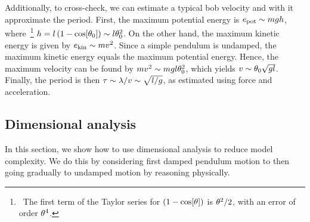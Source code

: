 Additionally, to cross-check, we can estimate a typical bob velocity and with it approximate the period. First, the maximum potential energy is $e_\text{pot}\sim mgh$, where~\footnote{~The first term of the Taylor series for $\left(1 - \cos\!\left[{\theta}\right]\right)$ is $\theta^2/2$, with an error of order $\theta^4$.} $h = l\left(1 - \cos\!\left[{\theta_0}\right]\right)\sim l\theta_0^2$. On the other hand, the maximum kinetic energy is given by $e_\text{kin}\sim mv^2$. Since a simple pendulum is undamped, the maximum kinetic energy equals the maximum potential energy. Hence, the maximum velocity can be found by $mv^2\sim mgl\theta_0^2$, which yields $v\sim\theta_0\sqrt{gl}$. Finally, the period is then $\tau\sim\lambda/v\sim\sqrt{l/g}$, as estimated using force and acceleration.



\subsection{Dimensional analysis}\label{subsec:dimanalysisorderofmag}
In this section, we show how to use dimensional analysis to reduce model complexity. We do this by considering first damped pendulum motion to then going gradually to undamped motion by reasoning physically.


